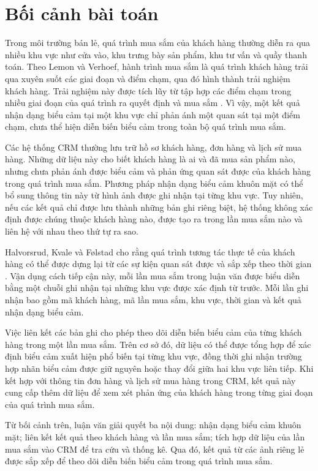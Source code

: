 \documentclass[../LuanVan.tex]{subfiles}
\begin{document}
\section{Bối cảnh bài toán}
Trong môi trường bán lẻ, quá trình mua sắm của khách hàng thường diễn ra qua nhiều khu vực như cửa vào, khu trưng bày sản phẩm, khu tư vấn và quầy thanh toán. Theo Lemon và Verhoef, hành trình mua sắm là quá trình khách hàng trải qua xuyên suốt các giai đoạn và điểm chạm, qua đó hình thành trải nghiệm khách hàng. Trải nghiệm này được tích lũy từ tập hợp các điểm chạm trong nhiều giai đoạn của quá trình ra quyết định và mua sắm \cite{lemon2016customerjourney}. Vì vậy, một kết quả nhận dạng biểu cảm tại một khu vực chỉ phản ánh một quan sát tại một điểm chạm, chưa thể hiện diễn biến biểu cảm trong toàn bộ quá trình mua sắm.

Các hệ thống CRM thường lưu trữ hồ sơ khách hàng, đơn hàng và lịch sử mua hàng. Những dữ liệu này cho biết khách hàng là ai và đã mua sản phẩm nào, nhưng chưa phản ánh được biểu cảm và phản ứng quan sát được của khách hàng trong quá trình mua sắm. Phương pháp nhận dạng biểu cảm khuôn mặt có thể bổ sung thông tin này từ hình ảnh được ghi nhận tại từng khu vực. Tuy nhiên, nếu các kết quả chỉ được lưu thành những bản ghi riêng biệt, hệ thống không xác định được chúng thuộc khách hàng nào, được tạo ra trong lần mua sắm nào và liên hệ với nhau theo thứ tự ra sao.

Halvorsrud, Kvale và Følstad cho rằng quá trình tương tác thực tế của khách hàng có thể được dựng lại từ các sự kiện quan sát được và sắp xếp theo thời gian \cite{halvorsrud2016journey}. Vận dụng cách tiếp cận này, mỗi lần mua sắm trong luận văn được biểu diễn bằng một chuỗi ghi nhận tại những khu vực được xác định từ trước. Mỗi lần ghi nhận bao gồm mã khách hàng, mã lần mua sắm, khu vực, thời gian và kết quả nhận dạng biểu cảm.

Việc liên kết các bản ghi cho phép theo dõi diễn biến biểu cảm của từng khách hàng trong một lần mua sắm. Trên cơ sở đó, dữ liệu có thể được tổng hợp để xác định biểu cảm xuất hiện phổ biến tại từng khu vực, đồng thời ghi nhận trường hợp nhãn biểu cảm được giữ nguyên hoặc thay đổi giữa hai khu vực liên tiếp. Khi kết hợp với thông tin đơn hàng và lịch sử mua hàng trong CRM, kết quả này cung cấp thêm dữ liệu để xem xét phản ứng của khách hàng trong từng giai đoạn của quá trình mua sắm.

Từ bối cảnh trên, luận văn giải quyết ba nội dung: nhận dạng biểu cảm khuôn mặt; liên kết kết quả theo khách hàng và lần mua sắm; tích hợp dữ liệu của lần mua sắm vào CRM để tra cứu và thống kê. Qua đó, kết quả từ các ảnh riêng lẻ được sắp xếp để theo dõi diễn biến biểu cảm trong quá trình mua sắm.
\end{document}
